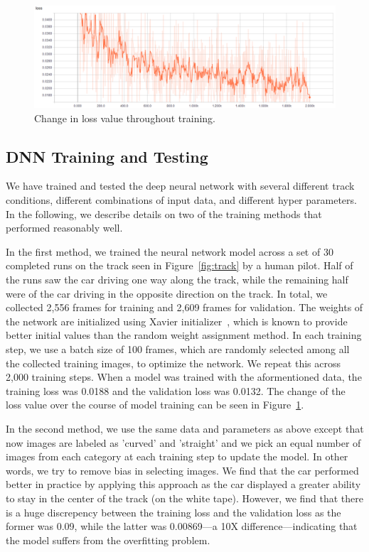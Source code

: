 \begin{figure}[t]
  \centering
  \includegraphics[width=.9\textwidth]{figs/TrainingLoss}
  \caption{Change in loss value throughout training.}
  \label{fig:modelloss}
\end{figure}


\subsection{DNN Training and Testing}
We have trained and tested the deep neural network with several
different track conditions, different combinations of input
data, and different hyper parameters. In the following, we describe
details on two of the training methods that performed reasonably well.

In the first method, we trained the neural network model across a set 
of 30 completed runs on the track seen in Figure~\ref{fig:track} by a
human pilot. Half of the runs saw the car driving one way along the
track, while the remaining half were of the car driving in the
opposite direction on the track.
In total, we collected 2,556 frames for training and 2,609 
frames for validation.
The weights of the network are initialized using Xavier
initializer~\cite{Glorot2010}, which is known to provide better
initial values than the random weight assignment method.
In each training step, we use a batch
size of 100 frames, which are randomly selected among all the
collected training images, to optimize the network.
We repeat this across 2,000 training steps. When a model was trained
with the  aformentioned data, the training loss was 0.0188 and the
validation  loss was 0.0132.
The change of the loss value over the course of model training can be
seen in Figure~\ref{fig:modelloss}.

In the second method, we use the same data and parameters as  above 
except that now images are labeled as 'curved' and 'straight' and we pick an
equal number of images from each category at each training step to
update the model. In other words, we try to remove bias in selecting
images. We find that the car performed better in practice by applying
this approach as the car displayed a greater ability to stay in the
center of the track (on the white tape).
However, we find that there is a huge discrepency between the training
loss and the validation loss as the former was 0.09, while the latter
was 0.00869---a 10X difference---indicating that the model suffers from
the overfitting problem.

